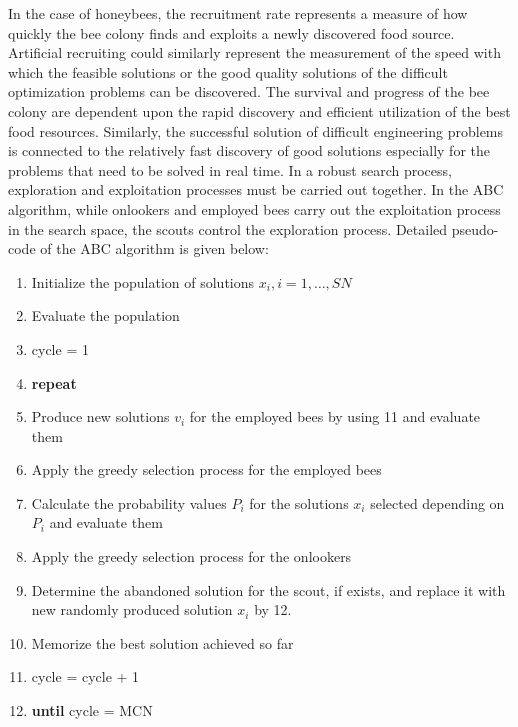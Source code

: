 \documentclass[pdftex,11pt]{article}
\begin{document}
In the case of honeybees, the recruitment rate represents a measure of how quickly the bee colony finds and exploits a newly discovered food source. Artificial recruiting could similarly represent the measurement of the speed with which the feasible solutions or the good quality solutions of the difficult optimization problems can be discovered. The survival and progress of the bee colony are dependent upon the rapid discovery and efficient utilization of the best food resources. Similarly, the successful solution of difficult engineering problems is connected to the relatively fast discovery of good solutions especially for the problems that need to be solved in real time. In a robust search process, exploration and exploitation processes must be carried out together. In the ABC algorithm, while onlookers and employed bees carry out the exploitation process in the search space, the scouts control the exploration process. Detailed pseudo-code of the ABC algorithm is given below:
\begin{enumerate}
\item Initialize the population of solutions $x_i, i = 1, \dots,SN$
\item Evaluate the population
\item cycle = 1
\item \textbf{repeat}
\item Produce new solutions $v_i$ for the employed bees by using 11 and evaluate them
\item Apply the greedy selection process for the employed bees
\item Calculate the probability values $P_i$ for the solutions $x_i$ selected depending on $P_i$ and evaluate them
\item Apply the greedy selection process for the onlookers
\item Determine the abandoned solution for the scout, if exists, and replace it with new randomly produced solution $x_i$ by 12.
\item Memorize the best solution achieved so far
\item cycle = cycle + 1
\item \textbf{until} cycle = MCN
\end{enumerate}
\end{document}
